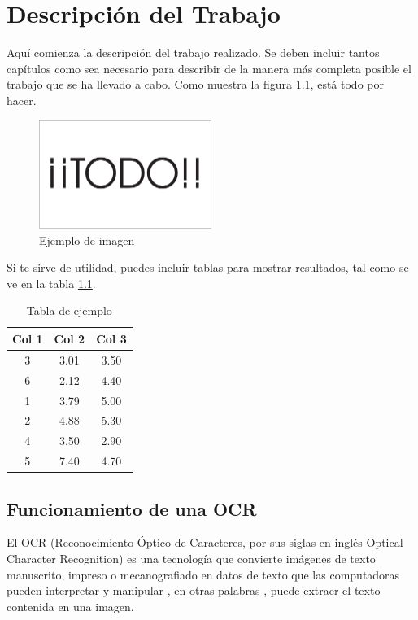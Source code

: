 \chapter{Descripción del Trabajo}
\label{cap:descripcionTrabajo}

Aquí comienza la descripción del trabajo realizado. Se deben incluir tantos capítulos como sea necesario para describir de la manera más completa posible el trabajo que se ha llevado a cabo. Como muestra la figura \ref{fig:sampleImage}, está todo por hacer.

\begin{figure}[h]
	\centering
	\includegraphics[width = 0.5\textwidth]{Imagenes/Vectorial/Todo.pdf}
	\caption{Ejemplo de imagen}
	\label{fig:sampleImage}
\end{figure}

Si te sirve de utilidad, puedes incluir tablas para mostrar resultados, tal como se ve en la tabla \ref{tab:sampleTable}.


\begin{table}
	\centering
	\begin{tabular}{c|c|c}
		\textbf{Col 1} & \textbf{Col 2} & \textbf{Col 3} \\
		\hline\hline
		3 & 3.01 & 3.50\\
		6 & 2.12 & 4.40\\
		1 & 3.79 & 5.00\\
		2 & 4.88 & 5.30\\
		4 & 3.50 & 2.90\\
		5 & 7.40 & 4.70\\
		\hline
	\end{tabular}
	\caption{Tabla de ejemplo}
	\label{tab:sampleTable}
\end{table}

\section{Funcionamiento de una OCR}
El OCR (Reconocimiento Óptico de Caracteres, por sus siglas en inglés Optical Character Recognition) es una tecnología que convierte imágenes de texto manuscrito, impreso o mecanografiado en datos de texto que las computadoras pueden interpretar y manipular , en otras palabras , puede extraer el texto contenida en una imagen.

